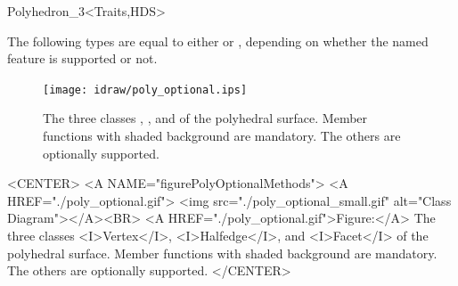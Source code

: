 \begin{ccClassTemplate}{Polyhedron_3<Traits,HDS>}
\begin{ccAdvanced}

The following types are equal to either  or
, depending on whether the named feature is
supported or not.

\ccGlue
{}
\ccGlue
{}
\ccGlue
{}
\ccGlue
{}
\ccGlue
{}
\ccGlue
{}
\ccGlue
{}
\ccGlue
{}

\end{ccAdvanced}

\end{ccClassTemplate} 


\begin{ccTexOnly}
    \begin{figure}
        \begin{center}
          \parbox{\textwidth}{%
              \texttt{[image: idraw/poly\_optional.ips]}%
          }
        \end{center}
        \caption{The three classes \protect{}, 
          \protect{}, and 
          \protect{} of the polyhedral surface. Member
          functions with shaded background are mandatory. The others
          are optionally supported.}
        \label{figurePolyOptionalMethods}
    \end{figure}
\end{ccTexOnly}

\begin{ccHtmlOnly}
    <CENTER>
    <A NAME="figurePolyOptionalMethods">
    <A HREF="./poly_optional.gif">
        <img src="./poly_optional_small.gif" 
             alt="Class Diagram"></A><BR>
    <A HREF="./poly_optional.gif">Figure:</A>
    The three classes <I>Vertex</I>, <I>Halfedge</I>, and 
          <I>Facet</I> of the polyhedral surface. Member
          functions with shaded background are mandatory. The others
          are optionally supported.
    </CENTER>
\end{ccHtmlOnly}


